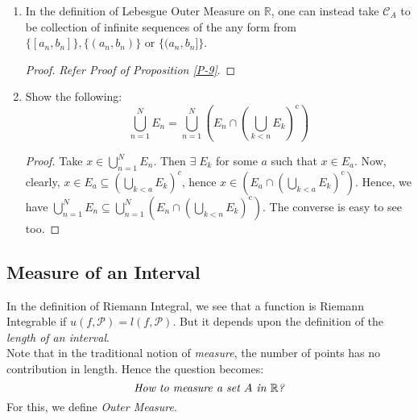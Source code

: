 \documentclass{article}
\theoremstyle{definition}
\theoremstyle{remark}
\theoremstyle{definition}
\theoremstyle{definition}
\theoremstyle{definition}
\newcommand{\intrs}{\cap}
\newcommand{\bunion}{\bigcup}
\newcommand{\bintrs}{\bigcap}
\newcommand{\lsum}[2]{l(#1,\mathcal{#2})}
\newcommand{\usum}[2]{u(#1,\mathcal{#2})}
\newcommand{\R}{\mathbb{R}}
\newcommand{\N}{\mathbb{N}}
\newcommand{\alg}[1]{\mathscr{#1}}
\newcommand{\comp}[1]{#1^{\text{c}}}
\begin{document}
\begin{enumerate}
{\begin{proof}
	\[A= \{a_1,a_2,\dots\}.\]
	Construct a ball around $ a_{i_1} $ of any radius $ r_1 >0 $. Since $ A $ is perfect, therefore $ \exists $ $ a_{i_2} \in B_{r_{1}} (a_{i_1}) \intrs A = C_1$. Similarly, for some $ r_2>0 $, we have $ a_{i_3} \in B_{r_2}(a_{i_2}) \intrs B_{r_1}(a_{i_1}) \intrs A = C_2$ such that $ a_{i_1}\notin C_2 $ and so on. In general, we would have the following,
	\[a_{i_{n+1}} \in \left (\bintrs_{j=1}^n B_{r_j}(a_{i_j}) \right ) \intrs A = C_n.\]
	Now, consider $ C = \intrs_n C_n $. Since $ C_{n+1} \subseteq C_n $, therefore $ C\neq \Phi $. But, $ a_i\notin C $ for any $ i \in\N $ as $ a_i \notin C_{i+1} $. Therefore we have a contradiction. Hence $ A $ cannot by countably infinite, it must only be uncountable.
\end{proof}	
}
\item {In the definition of Lebesgue Outer Measure on $ \R $, one can instead take $ \alg{C}_A $ to be collection of infinite sequences of the any form from $ \{[a_n,b_n]\}, \{(a_n,b_n)\} $ or $ \{(a_n,b_n]\} $.
\begin{proof}
	\emph{Refer Proof of Proposition \ref{P-9}}.
\end{proof}
}
\item {Show the following:
\[\bunion_{n=1}^N E_n = \bunion_{n=1}^N \left (E_n \intrs \comp{\left ( \bunion_{k<n} E_k\right )}\right )\]
\begin{proof}
Take $ x\in \bunion_{n=1}^N E_n $. Then $ \exists \; E_k $ for some $a  $ such that $ x\in E_a $. Now, clearly, $ x\in E_a \subseteq \left ( \bunion_{k<a} E_k\right )^c $, hence $ x\in\left (E_a \intrs \comp{\left ( \bunion_{k<a} E_k\right )}\right )  $. Hence, we have $ \bunion_{n=1}^N E_n \subseteq  \bunion_{n=1}^N \left (E_n \intrs \comp{\left ( \bunion_{k<n} E_k\right )}\right ) $. The converse is easy to see too.
\end{proof}
}

\end{enumerate}
\newpage
\subsection{Measure of an Interval}
In the definition of Riemann Integral, we see that a function is Riemann Integrable if $ \usum{f}{P} = \lsum{f}{P} $. But it depends upon the definition of the \emph{length of an interval}.\\
Note that in the traditional notion of \emph{measure}, the number of points has no contribution in length. Hence the question becomes:
\[\text{\emph{How to measure a set $ A $ in $ \R $?}}\]
For this, we define \emph{Outer Measure}.
\end{document}
